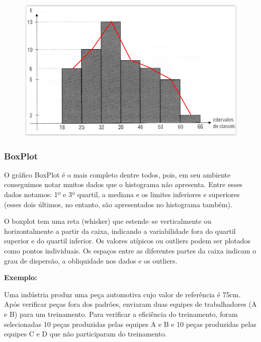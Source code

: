 \documentclass[
	12pt,				%
	oneside,			%
	a4paper,			%
	english,			%
	french,				%
	spanish,			%
	brazil,				%
	]{abntex2}
\begin{document}
\begin{figure}[H]
\begin{center}

\includegraphics[scale=0.5]{grafico6.jpg}  

\end{center}
\end{figure}

\subsubsection{BoxPlot}

O gráfico BoxPlot é o mais completo dentre todos, pois, em seu ambiente conseguimos notar muitos dados que o histograma não apresenta. Entre esses dados notamos: 1º e 3º quartil, a mediana e os limites inferiores e superiores (esses dois últimos, no entanto, são apresentados no histograma também).

O boxplot tem uma reta (whisker) que estende–se verticalmente ou horizontalmente a partir da caixa, indicando a variabilidade fora do quartil superior e do quartil inferior. Os valores atípicos ou outliers podem ser plotados como pontos individuais. Os espaços entre as diferentes partes da caixa indicam o grau de dispersão, a obliquidade nos dados e os outliers.\cite{wiki}

\textbf{Exemplo:} 

Uma indústria produz uma peça automotiva cujo valor de referência é 75cm. Após verificar peças fora dos padrões, enviaram duas equipes de trabalhadores (A e B) para um treinamento. Para verificar a eficiência do treinamento, foram selecionadas 10 peças produzidas pelas equipes A e B e 10 peças produzidas pelas equipes C e D que não participaram do treinamento.
\end{document}
